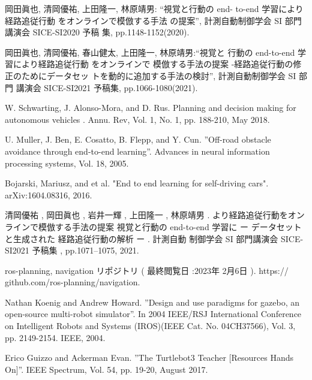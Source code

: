 \documentclass{jarticle}
\begin{document}
\footnotesize
\begin{thebibliography}{99}

岡田眞也, 清岡優祐, 上田隆一, 林原靖男: “視覚と行動の end-
to-end 学習により経路追従行動 をオンラインで模倣する手法
の提案”, 計測自動制御学会 SI 部門講演会 SICE-SI2020 予稿
集, pp.1148-1152(2020).

岡田眞也, 清岡優祐, 春山健太, 上田隆一, 林原靖男:“視覚と
行動の end-to-end 学習により経路追従行動 をオンラインで
模倣する手法の提案 -経路追従行動の修正のためにデータセッ
トを動的に追加する手法の検討”, 計測自動制御学会 SI 部門
講演会 SICE-SI2021 予稿集, pp.1066-1080(2021).

W. Schwarting, J. Alonso-Mora, and D. Rus.
Planning and decision making for
autonomous vehicles . Annu. Rev, Vol. 1, No. 1, pp. 188-210, May 2018.

U. Muller, J. Ben, E. Cosatto, B. Flepp, and Y. Cun. ”Oﬀ-road obstacle avoidance
through end-to-end learning”. Advances in neural information processing systems,
Vol. 18, 2005.

Bojarski, Mariusz, and et al.
"End to end learning for self-driving cars".
arXiv:1604.08316, 2016.

清岡優祐 , 岡田眞也 , 岩井一輝 , 上田隆一 , 林原靖男 .
より経路追従行動をオンラインで模倣する手法の提案
視覚と行動の end-to-end 学習に
ー データセットと生成された
経路追従行動の解析 ー . 計測自動 制御学会 SI 部門講演会 SICE-SI2021 予稿集 , pp.1071–1075, 2021.

ros-planning, navigation リポジトリ ( 最終閲覧日 :2023年 2月6日 ). https://
github.com/ros-planning/navigation.

Nathan Koenig and Andrew Howard. ”Design and use paradigms for gazebo, an
open-source multi-robot simulator”. In 2004 IEEE/RSJ International Conference
on Intelligent Robots and Systems (IROS)(IEEE Cat. No. 04CH37566), Vol. 3, pp.
2149-2154. IEEE, 2004.

Erico Guizzo and Ackerman Evan. ”The Turtlebot3 Teacher [Resources Hands On]”.
IEEE Spectrum, Vol. 54, pp. 19-20, August 2017.

\end{thebibliography}

\normalsize
\end{document}
